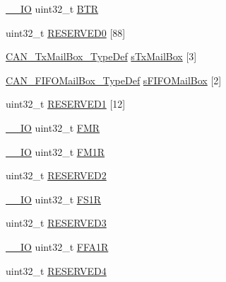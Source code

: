 \begin{DoxyCompactItemize}
\item 
\mbox{\hyperlink{group___c_m_s_i_s___c_m3__core__definitions_gaec43007d9998a0a0e01faede4133d6be}{\+\_\+\+\_\+\+IO}} uint32\+\_\+t \mbox{\hyperlink{struct_c_a_n___type_def_accad1e4155459a13369f5ad0e7c6da29}{B\+TR}}
\item 
uint32\+\_\+t \mbox{\hyperlink{struct_c_a_n___type_def_ad0cc7fb26376c435bbf148e962739337}{R\+E\+S\+E\+R\+V\+E\+D0}} \mbox{[}88\mbox{]}
\item 
\mbox{\hyperlink{struct_c_a_n___tx_mail_box___type_def}{C\+A\+N\+\_\+\+Tx\+Mail\+Box\+\_\+\+Type\+Def}} \mbox{\hyperlink{struct_c_a_n___type_def_a328925e230f68a775f6f4ad1076c27ce}{s\+Tx\+Mail\+Box}} \mbox{[}3\mbox{]}
\item 
\mbox{\hyperlink{struct_c_a_n___f_i_f_o_mail_box___type_def}{C\+A\+N\+\_\+\+F\+I\+F\+O\+Mail\+Box\+\_\+\+Type\+Def}} \mbox{\hyperlink{struct_c_a_n___type_def_aa6053bc607535d9ecf7a3d887c0cc053}{s\+F\+I\+F\+O\+Mail\+Box}} \mbox{[}2\mbox{]}
\item 
uint32\+\_\+t \mbox{\hyperlink{struct_c_a_n___type_def_a046ef464378aaaaafaf999c23a4dc55e}{R\+E\+S\+E\+R\+V\+E\+D1}} \mbox{[}12\mbox{]}
\item 
\mbox{\hyperlink{group___c_m_s_i_s___c_m3__core__definitions_gaec43007d9998a0a0e01faede4133d6be}{\+\_\+\+\_\+\+IO}} uint32\+\_\+t \mbox{\hyperlink{struct_c_a_n___type_def_a1a6a0f78ca703a63bb0a6b6f231f612f}{F\+MR}}
\item 
\mbox{\hyperlink{group___c_m_s_i_s___c_m3__core__definitions_gaec43007d9998a0a0e01faede4133d6be}{\+\_\+\+\_\+\+IO}} uint32\+\_\+t \mbox{\hyperlink{struct_c_a_n___type_def_aefe6a26ee25947b7eb5be9d485f4d3b0}{F\+M1R}}
\item 
uint32\+\_\+t \mbox{\hyperlink{struct_c_a_n___type_def_ab29069c9fd10eeec47414abd8d06822f}{R\+E\+S\+E\+R\+V\+E\+D2}}
\item 
\mbox{\hyperlink{group___c_m_s_i_s___c_m3__core__definitions_gaec43007d9998a0a0e01faede4133d6be}{\+\_\+\+\_\+\+IO}} uint32\+\_\+t \mbox{\hyperlink{struct_c_a_n___type_def_ac6296402924b37966c67ccf14a381976}{F\+S1R}}
\item 
uint32\+\_\+t \mbox{\hyperlink{struct_c_a_n___type_def_af730af32307f845895465e8ead57d20c}{R\+E\+S\+E\+R\+V\+E\+D3}}
\item 
\mbox{\hyperlink{group___c_m_s_i_s___c_m3__core__definitions_gaec43007d9998a0a0e01faede4133d6be}{\+\_\+\+\_\+\+IO}} uint32\+\_\+t \mbox{\hyperlink{struct_c_a_n___type_def_ae2decd14b26f851e00a31b42d15293ce}{F\+F\+A1R}}
\item 
uint32\+\_\+t \mbox{\hyperlink{struct_c_a_n___type_def_a51c408c7c352b8080f0c6d42bf811d43}{R\+E\+S\+E\+R\+V\+E\+D4}}

\end{DoxyCompactItemize}
